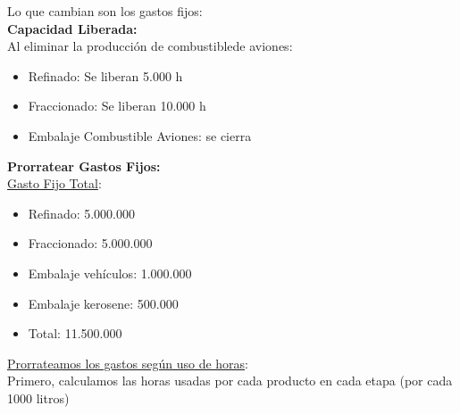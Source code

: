 \documentclass[10pt,a4paper]{article}
\begin{document}
\begin{enumerate}
    \vspace{0.5em}

    Lo que cambian son los gastos fijos: \\

    \textbf{Capacidad Liberada:} \\

    Al eliminar la producción de combustiblede aviones:

    \begin{itemize}

        \item Refinado: Se liberan 5.000 h
        \item Fraccionado: Se liberan 10.000 h
        \item Embalaje Combustible Aviones: se cierra

    \end{itemize}

    \vspace{0.5em}

    \textbf{Prorratear Gastos Fijos:} \\

    \underline{Gasto Fijo Total}:

    \begin{itemize}

        \item Refinado: 5.000.000
        \item Fraccionado: 5.000.000
        \item Embalaje vehículos: 1.000.000
        \item Embalaje kerosene: 500.000 \\
        \item Total: 11.500.000 \\

    \end{itemize}

    \underline{Prorrateamos los gastos según uso de horas}: \\

    Primero, calculamos las horas usadas por cada producto en cada etapa (por cada 1000 litros)

    \begin{center}
    \end{center}


\end{enumerate}
\end{document}
